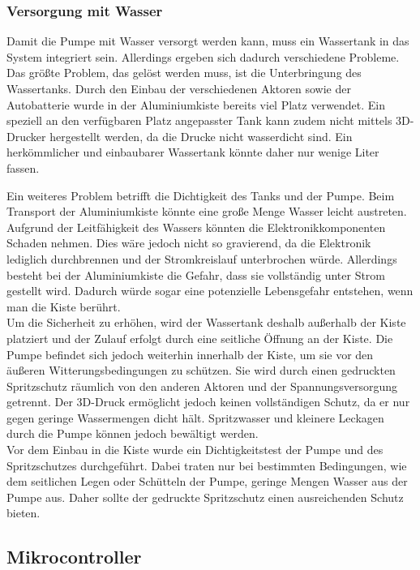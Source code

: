 \subsubsection{Versorgung mit Wasser}

Damit die Pumpe mit Wasser versorgt werden kann, muss ein Wassertank in das System integriert sein. Allerdings ergeben sich dadurch verschiedene Probleme.
\\
Das größte Problem, das gelöst werden muss, ist die Unterbringung des Wassertanks. Durch den Einbau der verschiedenen Aktoren sowie der Autobatterie wurde in der Aluminiumkiste bereits viel Platz verwendet. Ein speziell an den verfügbaren Platz angepasster Tank kann zudem nicht mittels 3D-Drucker hergestellt werden, da die Drucke nicht wasserdicht sind. Ein herkömmlicher und einbaubarer Wassertank könnte daher nur wenige Liter fassen.

Ein weiteres Problem betrifft die Dichtigkeit des Tanks und der Pumpe. Beim Transport der Aluminiumkiste könnte eine große Menge Wasser leicht austreten. Aufgrund der Leitfähigkeit des Wassers könnten die Elektronikkomponenten Schaden nehmen. Dies wäre jedoch nicht so gravierend, da die Elektronik lediglich durchbrennen und der Stromkreislauf unterbrochen würde. Allerdings besteht bei der Aluminiumkiste die Gefahr, dass sie vollständig unter Strom gestellt wird. Dadurch würde sogar eine potenzielle Lebensgefahr entstehen, wenn man die Kiste berührt.
\\
Um die Sicherheit zu erhöhen, wird der Wassertank deshalb außerhalb der Kiste platziert und der Zulauf erfolgt durch eine seitliche Öffnung an der Kiste. Die Pumpe befindet sich jedoch weiterhin innerhalb der Kiste, um sie vor den äußeren Witterungsbedingungen zu schützen. Sie wird durch einen gedruckten Spritzschutz räumlich von den anderen Aktoren und der Spannungsversorgung getrennt. Der 3D-Druck ermöglicht jedoch keinen vollständigen Schutz, da er nur gegen geringe Wassermengen dicht hält. Spritzwasser und kleinere Leckagen durch die Pumpe können jedoch bewältigt werden.
\\
Vor dem Einbau in die Kiste wurde ein Dichtigkeitstest der Pumpe und des Spritzschutzes durchgeführt. Dabei traten nur bei bestimmten Bedingungen, wie dem seitlichen Legen oder Schütteln der Pumpe, geringe Mengen Wasser aus der Pumpe aus. Daher sollte der gedruckte Spritzschutz einen ausreichenden Schutz bieten.

\subsection{Mikrocontroller}

